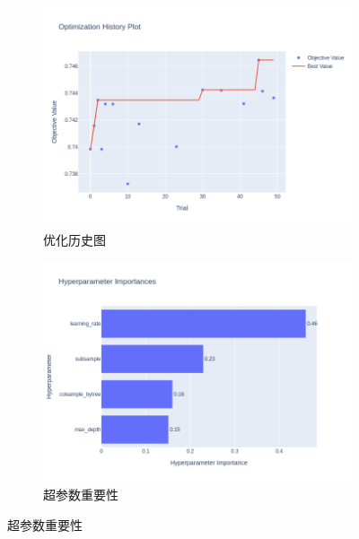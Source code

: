 \documentclass{thuemp}
\begin{document}
\begin{figure}[H]
    \centering
    \begin{subfigure}[b]{0.49\textwidth}
        \centering
        \includegraphics[width=\textwidth]{image/results/xgboost_optimization_history.png} %
        \caption{优化历史图}
        \label{fig:xgb_history}
    \end{subfigure}
    \hfill
    \begin{subfigure}[b]{0.49\textwidth}
        \centering
        \includegraphics[width=\textwidth]{image/results/xgboost_param_importance.png} %
        \caption{超参数重要性}
        \label{fig:xgb_importance}
    \end{subfigure}
    

\end{figure}
\end{document}

